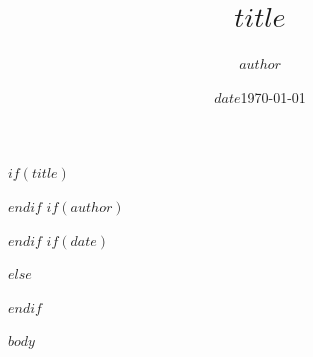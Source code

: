 \documentclass{book}
\begin{document}
$if(title)$
\title{$title$}
$endif$
$if(author)$
\author{$author$}
$endif$
$if(date)$
\date{$date$}
$else$
\date{\today}
$endif$

\maketitle
\tableofcontents

$body$
\end{document}
